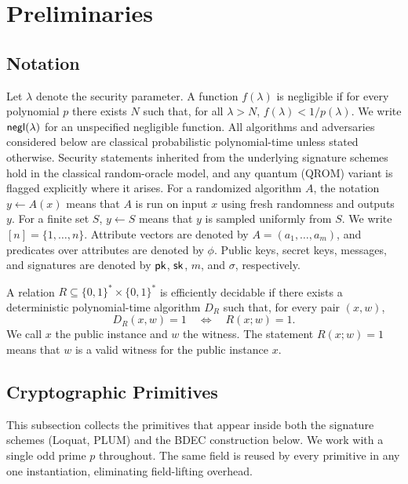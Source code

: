 \section{Preliminaries} \label{sec:prelim}
\subsection{Notation}
Let $\lambda$ denote the security parameter. A function $f(\lambda)$ is negligible if for every polynomial $p$ there exists $N$ such that, for all $\lambda>N$, $f(\lambda)<1/p(\lambda)$. We write $\mathsf{negl}(\lambda)$ for an unspecified negligible function. All algorithms and adversaries considered below are classical probabilistic polynomial-time unless stated otherwise. Security statements inherited from the underlying signature schemes hold in the classical random-oracle model, and any quantum (QROM) variant is flagged explicitly where it arises. For a randomized algorithm $A$, the notation $y\leftarrow A(x)$ means that $A$ is run on input $x$ using fresh randomness and outputs $y$. For a finite set $S$, $y\leftarrow S$ means that $y$ is sampled uniformly from $S$. We write $[n]=\{1,\ldots,n\}$. Attribute vectors are denoted by $A=(a_1,\ldots,a_m)$, and predicates over attributes are denoted by $\phi$. Public keys, secret keys, messages, and signatures are denoted by $\mathsf{pk}$, $\mathsf{sk}$, $m$, and $\sigma$, respectively.

\begin{definition}
A relation $R\subseteq\{0,1\}^\ast\times\{0,1\}^\ast$ is efficiently decidable if there exists a deterministic polynomial-time algorithm $D_R$ such that, for every pair $(x,w)$,
\begin{equation*}
  D_R(x,w)=1
  \quad\Longleftrightarrow\quad
  R(x;w)=1.
\end{equation*}
We call $x$ the public instance and $w$ the witness. The statement $R(x;w)=1$ means that $w$ is a valid witness for the public instance $x$.
\end{definition}

\subsection{Cryptographic Primitives}
This subsection collects the primitives that appear inside both the signature schemes (Loquat, PLUM) and the BDEC construction below. We work with a single odd prime $p$ throughout. The same field is reused by every primitive in any one instantiation, eliminating field-lifting overhead.

